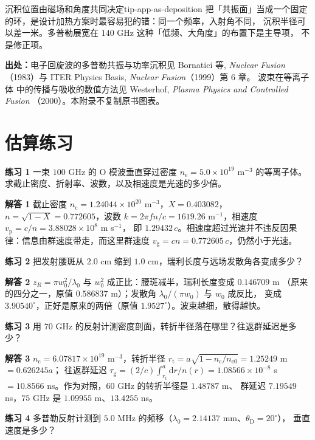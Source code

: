 \begin{tip}{沉积位置由磁场和角度共同决定}{tip-app-as-deposition}
把「共振面」当成一个固定的环，是设计加热方案时最容易犯的错：同一个频率，入射角不同，
沉积半径可以差一米。多普勒展宽在 $140$ GHz 这种「低频、大角度」的布置下是主导项，
不是修正项。
\end{tip}

{\footnotesize
\textbf{出处：}电子回旋波的多普勒共振与功率沉积见 Bornatici 等, \emph{Nuclear Fusion}
（1983）与 ITER Physics Basis, \emph{Nuclear Fusion}（1999）第 6 章。
波束在等离子体
中的传播与吸收的数值方法见 Westerhof, \emph{Plasma Physics and Controlled Fusion}
（2000）。本附录不复制原书图表。
}


\section{估算练习}
\label{sec:app-as-problems}

\textbf{练习 1}
一束 $100$ GHz 的 O 模波垂直穿过密度 $n_\mathrm{e}=5.0\times10^{19}$ m$^{-3}$ 的等离子体。
求截止密度、折射率、波数，以及相速度是光速的多少倍。

\textbf{解答 1}
截止密度 $n_\mathrm{c}=1.24044\times10^{20}$ m$^{-3}$，$X=0.403082$，
$n=\sqrt{1-X}=0.772605$，波数
$k=2\pi f n/c=1619.26$ m$^{-1}$，相速度 $v_\mathrm{p}=c/n=3.88028\times10^{8}$ m s$^{-1}$，
即 $1.29432\,c$。相速度超过光速并不违反因果律：信息由群速度带走，而这里群速度
$v_\mathrm{g}=cn=0.772605\,c$，仍然小于光速。

\textbf{练习 2}
把发射腰斑从 $2.0$ cm 缩到 $1.0$ cm，瑞利长度与远场发散角各变成多少？

\textbf{解答 2}
$z_R=\pi w_0^2/\lambda_0$ 与 $w_0^2$ 成正比：腰斑减半，瑞利长度变成 $0.146709$ m
（原来的四分之一，原值 $0.586837$ m）；发散角 $\lambda_0/(\pi w_0)$ 与 $w_0$ 成反比，
变成 $3.90540^\circ$，正好是原来的两倍（原值 $1.9527^\circ$）。波束越细，散得越快。

\textbf{练习 3}
用 $70$ GHz 的反射计测密度剖面，转折半径落在哪里？往返群延迟是多少？

\textbf{解答 3}
$n_\mathrm{c}=6.07817\times10^{19}$ m$^{-3}$，转折半径
$r_\mathrm{t}=a\sqrt{1-n_\mathrm{c}/n_\mathrm{e0}}=1.25249$ m $=0.626245a$；
往返群延迟 $\tau_\mathrm{g}=(2/c)\int_{r_\mathrm{t}}^{a}\mathrm{d}r/n(r)
=1.08566\times10^{-8}$ s $=10.8566$ ns。作为对照，$60$ GHz 的转折半径是 $1.48787$ m、
群延迟 $7.19549$ ns，$75$ GHz 是 $1.09955$ m、$13.4255$ ns。

\textbf{练习 4}
多普勒反射计测到 $5.0$ MHz 的频移（$\lambda_0=2.14137$ mm、$\theta_\mathrm{D}=20^\circ$），
垂直速度是多少？

